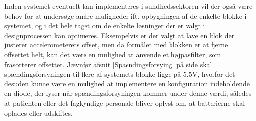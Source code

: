\noindent Inden systemet eventuelt kan implementeres i sundhedssektoren vil der også være behov for at undersøge andre muligheder ift. opbygningen af de enkelte blokke i systemet, og i det hele taget om de enkelte løsninger der er valgt i designprocessen kan optimeres. Eksempelvis er der valgt at lave en blok der justerer accelerometerets offset, men da formålet med blokken er at fjerne offsettet helt, kan det være en mulighed at anvende et højpasfilter, som frasorterer offsettet. Jævnfør afsnit \ref{Spaendingsforsying} på side \pageref{Spaendingsforsying} skal spændingsforsyningen til flere af systemets blokke ligge på $5.5$V, hvorfor det desuden kunne være en mulighed at implementere en konfiguration indeholdende en diode, der lyser når spændingsforsyningen kommer under denne værdi, således at patienten eller det fagkyndige personale bliver oplyst om, at batterierne skal oplades eller udskiftes. 
  
 
 